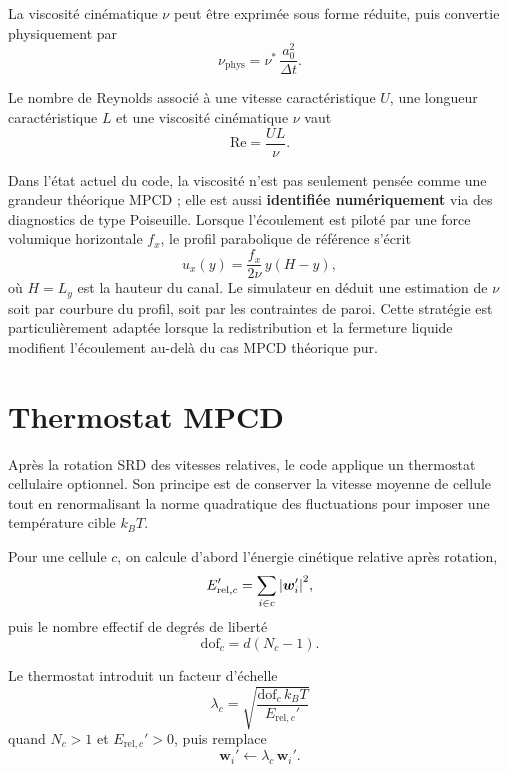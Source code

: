 \documentclass[11pt,a4paper]{article}
\begin{document}
La viscosité cinématique $\nu$ peut être exprimée sous forme réduite, puis convertie physiquement par
\begin{equation}
 \nu_{\mathrm{phys}} = \nu^*\,\frac{a_0^2}{\Delta t}.
\end{equation}

Le nombre de Reynolds associé à une vitesse caractéristique $U$, une longueur caractéristique $L$ et une viscosité cinématique $\nu$ vaut
\begin{equation}
 \mathrm{Re} = \frac{U L}{\nu}.
\end{equation}

Dans l'état actuel du code, la viscosité n'est pas seulement pensée comme une grandeur théorique MPCD ; elle est aussi \textbf{identifiée numériquement} via des diagnostics de type Poiseuille. Lorsque l'écoulement est piloté par une force volumique horizontale $f_x$, le profil parabolique de référence s'écrit
\begin{equation}
 u_x(y) = \frac{f_x}{2\nu}\,y(H-y),
\end{equation}
où $H=L_y$ est la hauteur du canal. Le simulateur en déduit une estimation de $\nu$ soit par courbure du profil, soit par les contraintes de paroi. Cette stratégie est particulièrement adaptée lorsque la redistribution et la fermeture liquide modifient l'écoulement au-delà du cas MPCD théorique pur.

\section{Thermostat MPCD}

Après la rotation SRD des vitesses relatives, le code applique un thermostat cellulaire optionnel. Son principe est de conserver la vitesse moyenne de cellule tout en renormalisant la norme quadratique des fluctuations pour imposer une température cible $k_B T$.

Pour une cellule $c$, on calcule d'abord l'énergie cinétique relative après rotation,
\begin{equation}
 E_{\mathrm{rel},c}' = \sum_{i\in c} \abs{\bm{w}_i'}^2,
\end{equation}
puis le nombre effectif de degrés de liberté
\begin{equation}
 \mathrm{dof}_c = d(N_c-1).
\end{equation}

Le thermostat introduit un facteur d'échelle
\begin{equation}
 \lambda_c = \sqrt{\frac{\mathrm{dof}_c\,k_B T}{E_{\mathrm{rel},c}'}}
\end{equation}
quand $N_c>1$ et $E_{\mathrm{rel},c}'>0$, puis remplace
\begin{equation}
 \bm{w}_i' \leftarrow \lambda_c\,\bm{w}_i'.
\end{equation}
\end{document}
